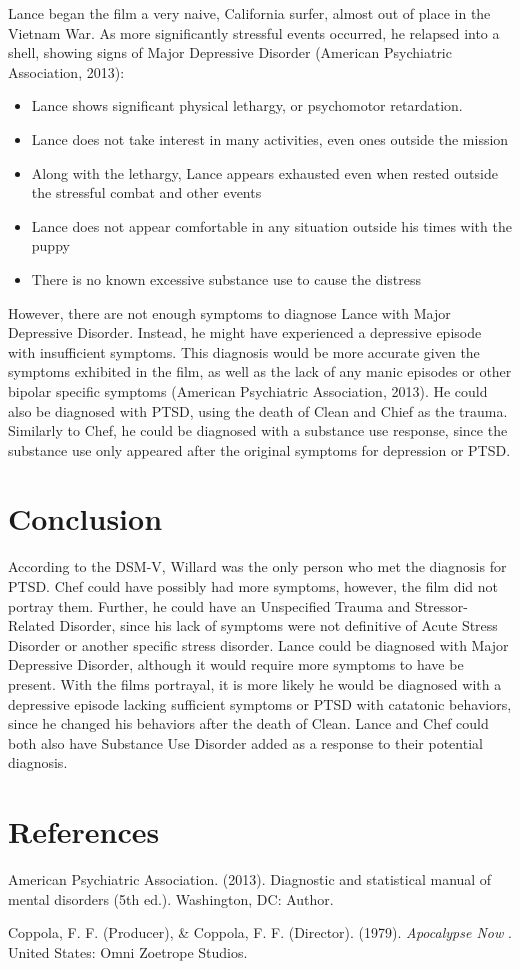 \documentclass[a4paper,man,natbib]{apa6}
\begin{document}
Lance began the film a very naive, California surfer, almost out of place in the Vietnam War. As more significantly stressful events occurred, he relapsed into a shell, showing signs of Major Depressive Disorder (American Psychiatric Association, 2013):
\begin{itemize}
\item Lance shows significant physical lethargy, or psychomotor retardation.
\item Lance does not take interest in many activities, even ones outside the mission
\item Along with the lethargy, Lance appears exhausted even when rested outside the stressful combat and other events
\item Lance does not appear comfortable in any situation outside his times with the puppy
\item There is no known excessive substance use to cause the distress
\end{itemize}
However, there are not enough symptoms to diagnose Lance with Major Depressive Disorder. Instead, he might have experienced a depressive episode with insufficient symptoms. This diagnosis would be more accurate given the symptoms exhibited in the film, as well as the lack of any manic episodes or other bipolar specific symptoms (American Psychiatric Association, 2013). He could also be diagnosed with PTSD, using the death of Clean and Chief as the trauma. Similarly to Chef, he could be diagnosed with a substance use response, since the substance use only appeared after the original symptoms for depression or PTSD.

\section{Conclusion}	

According to the DSM-V, Willard was the only person who met the diagnosis for PTSD. Chef could have possibly had more symptoms, however, the film did not portray them. Further, he could have an Unspecified Trauma and Stressor-Related Disorder, since his lack of symptoms were not definitive of Acute Stress Disorder or another specific stress disorder. Lance could be diagnosed with Major Depressive Disorder, although it would require more symptoms to have be present. With the films portrayal, it is more likely he would be diagnosed with a depressive episode lacking sufficient symptoms or PTSD with catatonic behaviors, since he changed his behaviors after the death of Clean. Lance and Chef could both also have Substance Use Disorder added as a response to their potential diagnosis. \\

\raggedbottom
\pagebreak
\section{References}

\noindent American Psychiatric Association. (2013). Diagnostic and statistical manual of mental
\indent disorders (5th ed.). Washington, DC: Author.

\noindent Coppola, F. F. (Producer), \& Coppola, F. F. (Director). (1979). \textit{Apocalypse Now}
. United States: Omni Zoetrope Studios.
\end{document}
